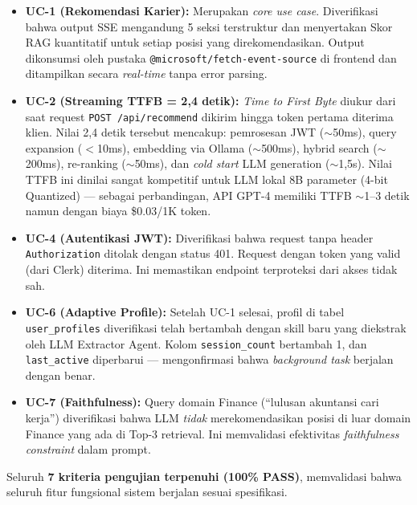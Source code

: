 \begin{itemize}
  \item \textbf{UC-1 (Rekomendasi Karier):} Merupakan \textit{core use case}. Diverifikasi
    bahwa output SSE mengandung 5 seksi terstruktur dan menyertakan Skor RAG kuantitatif
    untuk setiap posisi yang direkomendasikan. Output dikonsumsi oleh pustaka \texttt{@microsoft/fetch-event-source}
    di frontend dan ditampilkan secara \textit{real-time} tanpa error parsing.

  \item \textbf{UC-2 (Streaming TTFB = 2,4 detik):} \textit{Time to First Byte} diukur
    dari saat request \texttt{POST /api/recommend} dikirim hingga token pertama
    diterima klien. Nilai 2,4 detik tersebut mencakup: pemrosesan JWT ($\sim$50ms),
    query expansion ($<$10ms), embedding via Ollama ($\sim$500ms),
    hybrid search ($\sim$200ms), re-ranking ($\sim$50ms), dan
    \textit{cold start} LLM generation ($\sim$1,5s). Nilai TTFB ini dinilai sangat kompetitif
    untuk LLM lokal 8B parameter (4-bit Quantized) --- sebagai perbandingan, API GPT-4 memiliki TTFB
    $\sim$1--3 detik namun dengan biaya \$0.03/1K token.

  \item \textbf{UC-4 (Autentikasi JWT):} Diverifikasi bahwa request tanpa header
    \texttt{Authorization} ditolak dengan status 401. Request dengan token yang
    valid (dari Clerk) diterima. Ini memastikan endpoint terproteksi dari
    akses tidak sah.

  \item \textbf{UC-6 (Adaptive Profile):} Setelah UC-1 selesai, profil di tabel
    \texttt{user\_profiles} diverifikasi telah bertambah dengan skill baru yang
    diekstrak oleh LLM Extractor Agent. Kolom \texttt{session\_count} bertambah 1,
    dan \texttt{last\_active} diperbarui --- mengonfirmasi bahwa \textit{background task}
    berjalan dengan benar.

  \item \textbf{UC-7 (Faithfulness):} Query domain Finance (``lulusan akuntansi cari kerja'')
    diverifikasi bahwa LLM \textit{tidak} merekomendasikan posisi di luar domain Finance
    yang ada di Top-3 retrieval. Ini memvalidasi efektivitas \textit{faithfulness constraint}
    dalam prompt.
\end{itemize}

Seluruh \textbf{7 kriteria pengujian terpenuhi (100\% PASS)}, memvalidasi bahwa
seluruh fitur fungsional sistem berjalan sesuai spesifikasi.


